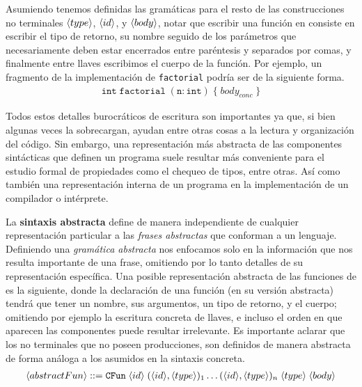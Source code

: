 Asumiendo tenemos definidas las gramáticas para el resto de las construcciones no terminales $\langle type \rangle$, $\langle id \rangle$, y $\langle body \rangle$, notar que escribir una función en \C{} consiste en escribir el tipo de retorno, su nombre seguido de los parámetros que necesariamente deben estar encerrados entre paréntesis y separados por comas, y finalmente entre llaves escribimos el cuerpo de la función.
Por ejemplo, un fragmento de la implementación de \texttt{factorial} podría ser de la siguiente forma.
\begin{gather*}
\texttt{int} \; \texttt{factorial} \; ( \texttt{n} : \texttt{int} ) \; \{ \; body_{conc} \; \}
\end{gather*}

Todos estos detalles burocráticos de escritura son importantes ya que, si bien algunas veces la sobrecargan, ayudan entre otras cosas a la lectura y organización del código.
Sin embargo, una representación más abstracta de las componentes sintácticas que definen un programa suele resultar más conveniente para el estudio formal de propiedades como el chequeo de tipos, entre otras.
Así como también una representación interna de un programa en la implementación de un compilador o intérprete.

La \textbf{sintaxis abstracta} define de manera independiente de cualquier representación particular a las \textit{frases abstractas} que conforman a un lenguaje.
Definiendo una \textit{gramática abstracta} nos enfocamos solo en la información que nos resulta importante de una frase, omitiendo por lo tanto detalles de su representación específica.
Una posible representación abstracta de las funciones de \C{} es la siguiente, donde la declaración de una función (en su versión abstracta) tendrá que tener un nombre, sus argumentos, un tipo de retorno, y el cuerpo; omitiendo por ejemplo la escritura concreta de llaves, e incluso el orden en que aparecen las componentes puede resultar irrelevante.
Es importante aclarar que los no terminales que no poseen producciones, son definidos de manera abstracta de forma análoga a los asumidos en la sintaxis concreta.
\begin{gather*}
\langle abstractFun \rangle ::= \texttt{CFun} \; \langle id \rangle \; ( \langle id \rangle, \langle type \rangle )_1 \ldots ( \langle id \rangle, \langle type \rangle )_n \; \langle type \rangle \; \langle body \rangle
\end{gather*}


